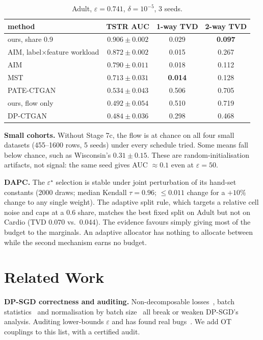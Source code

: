 \documentclass[journal]{IEEEtran}
\newcommand{\eps}{\varepsilon}
\begin{document}
\begin{table}[t]\centering\caption{Adult, $\eps=0.741$, $\delta=10^{-5}$, 3 seeds.}\label{tab:base}
\begin{tabular}{lccc}\toprule
method & TSTR AUC & 1-way TVD & 2-way TVD\\\midrule
ours, share 0.9 & $\mathbf{0.906\pm0.002}$ & 0.029 & \textbf{0.097}\\
AIM, label$\times$feature workload & $0.872\pm0.002$ & 0.015 & 0.267\\
AIM & $0.790\pm0.011$ & 0.018 & 0.112\\
MST & $0.713\pm0.031$ & \textbf{0.014} & 0.128\\
PATE-CTGAN & $0.534\pm0.043$ & 0.506 & 0.705\\
ours, flow only & $0.492\pm0.054$ & 0.510 & 0.719\\
DP-CTGAN & $0.484\pm0.036$ & 0.298 & 0.468\\\bottomrule
\end{tabular}\end{table}

\textbf{Small cohorts.} Without Stage 7c, the flow is at chance on all four small datasets (455--1600 rows, 5 seeds) under every schedule tried. Some means fall below chance, such as Wisconsin's $0.31\pm0.15$. These are random-initialisation artifacts, not signal: the same seed gives AUC $\approx0.1$ even at $\eps=50$.

\textbf{DAPC.} The $\eps^\star$ selection is stable under joint perturbation of its hand-set constants (2000 draws; median Kendall $\tau=0.96$; $\le0.011$ change for a $+10\%$ change to any single weight). The adaptive split rule, which targets a relative cell noise and caps at a 0.6 share, matches the best fixed split on Adult but not on Cardio (TVD 0.070 vs.\ 0.044). The evidence favours simply giving most of the budget to the marginals. An adaptive allocator has nothing to allocate between while the second mechanism earns no budget.

\section{Related Work}
\textbf{DP-SGD correctness and auditing.} Non-decomposable losses~\cite{kong2025nondecomposable}, batch statistics~\cite{yousefpour2021opacus} and normalisation by batch size~\cite{wang2026rethinking} all break or weaken DP-SGD's analysis. Auditing lower-bounds $\eps$ and has found real bugs~\cite{jagielski2020auditing,nasr2021adversary,nasr2023tight,steinke2023one,tramer2022debugging}. We add OT couplings to this list, with a certified audit.
\end{document}
